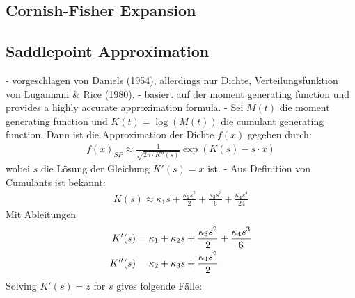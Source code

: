 \subsection{Cornish-Fisher Expansion}

\subsection{Saddlepoint Approximation}

- vorgeschlagen von Daniels (1954), allerdings nur Dichte, Verteilungsfunktion von Lugannani & Rice (1980).
- basiert auf der moment generating function und provides a highly accurate approximation formula.
- Sei $M(t)$ die moment generating function und $K(t) = \log(M(t))$ die cumulant generating function. Dann ist die Approximation der Dichte $f(x)$ gegeben durch:
\begin{align}
    \label{eq:sp_approximation}
    f(x)_{SP} \approx \frac{1}{\sqrt{2\pi\cdot K''(s)}}\exp(K(s) - s\cdot x)
\end{align}
wobei $s$ die Lösung der Gleichung $K'(s)=x$ ist.
- Aus Definition von Cumulants ist bekannt:
\begin{align}
    K(s) \approx \kappa_1 s + \frac{\kappa_2 s^2}{2} + \frac{\kappa_3 s^3}{6} + \frac{\kappa_4 s^4}{24}
\end{align}
Mit Ableitungen
\begin{align}
    K'(s) &= \kappa_1 + \kappa_2 s + \frac{\kappa_3 s^2}{2} + \frac{\kappa_4 s^3}{6} \notag \\
    K''(s) &= \kappa_2 + \kappa_3 s + \frac{\kappa_4 s^2}{2} \notag
\end{align}
Solving $K'(s)=z$ for $s$ gives folgende Fälle:
